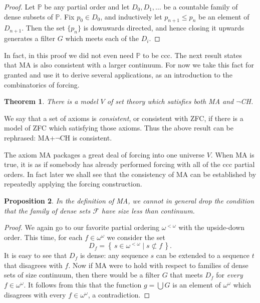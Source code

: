 \documentclass[11pt,oneside]{amsbook}
\newcommand{\set}[1]{\left\{\,#1\,\right\}}
\newcommand{\PP}{\mathbb P}
\theoremstyle{definition}
\theoremstyle{plain}
\newtheorem{thm}{Theorem}[section]
\newtheorem{prop}[thm]{Proposition}
\theoremstyle{definition}
\theoremstyle{remark}
\begin{document}
\begin{proof}
  Let $\PP$ be any partial order and let $D_0,D_1,\ldots$ be a countable family of dense subsets of $\PP$. Fix $p_0\in D_0$, and inductively let $p_{n+1}\leq p_n$ be an element of $D_{n+1}$. Then the set $\{p_n\}$ is downwards directed, and hence closing it upwards generates a filter $G$ which meets each of the $D_i$.
\end{proof}

In fact, in this proof we did not even need $\PP$ to be ccc. The next result states that MA is also consistent with a larger continuum. For now we take this fact for granted and use it to derive several applications, as an introduction to the combinatorics of forcing. 

\begin{thm}
  There is a model $V$ of set theory which satisfies both MA and $\neg$CH.
\end{thm}

We say that a set of axioms is \emph{consistent}, or consistent with ZFC, if there is a model of ZFC which satisfying those axioms. Thus the above result can be rephrased: MA+$\neg$CH is consistent.

The axiom MA packages a great deal of forcing into one universe $V$. When MA is true, it is as if somebody has already performed forcing with all of the ccc partial orders. In fact later we shall see that the consistency of MA can be established by repeatedly applying the forcing construction.

\begin{prop}
  In the definition of MA, we cannot in general drop the condition that the family of dense sets $\mathcal F$ have size less than continuum.
\end{prop}

\begin{proof}
  We again go to our favorite partial ordering $\omega^{<\omega}$ with the upside-down order. This time, for each $f\in\omega^\omega$ we consider the set
  \[D_f=\set{s\in\omega^{<\omega}\mid s\not\subset f}\text{.}
  \]
  It is easy to see that $D_f$ is dense: any sequence $s$ can be extended to a sequence $t$ that disagrees with $f$. Now if MA were to hold with respect to families of dense sets of size continuum, then there would be a filter $G$ that meets $D_f$ for \emph{every} $f\in\omega^\omega$. It follows from this that the function $g=\bigcup G$ is an element of $\omega^\omega$ which disagrees with every $f\in\omega^\omega$, a contradiction.
\end{proof}
\end{document}
